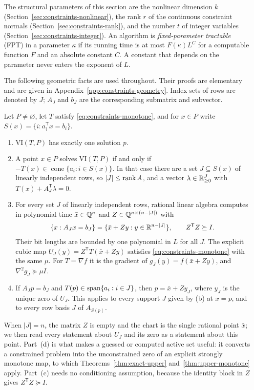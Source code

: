The structural parameters of this section are the nonlinear dimension $k$
(Section~\ref{sec:constraints-nonlinear}), the rank $r$ of the continuous
constraint normals (Section~\ref{sec:constraints-rank}), and the number $t$
of integer variables (Section~\ref{sec:constraints-integer}). An algorithm is
\emph{fixed-parameter tractable} (FPT) in a parameter $\kappa$ if its running
time is at most $F(\kappa)L^{C}$ for a computable function $F$ and an absolute
constant $C$. A constant that depends on the parameter never enters the
exponent of $L$.

The following geometric facts are used throughout. Their proofs are
elementary and are given in Appendix~\ref{app:constraints-geometry}. Index
sets of rows are denoted by $J$; $A_J$ and $b_J$ are the corresponding
submatrix and subvector.

\begin{lemma}
\label{lem:constraints-polyhedral}
Let $P\ne\varnothing$, let $T$ satisfy \eqref{eq:constraints-monotone}, and
for $x\in P$ write $S(x)=\{i:a_i^{\mathsf T}x=b_i\}$.
\begin{enumerate}[label=(\alph*)]
\item $\mathrm{VI}(T,P)$ has exactly one solution $p$.
\item A point $x\in P$ solves $\mathrm{VI}(T,P)$ if and only if
$-T(x)\in\operatorname{cone}\{a_i:i\in S(x)\}$. In that case there are a set
$J\subseteq S(x)$ of linearly independent rows, so $|J|\le\operatorname{rank} A$, and a
vector $\lambda\in\mathbb R^J_{\ge0}$ with $T(x)+A_J^{\mathsf T}\lambda=0$.
\item For every set $J$ of linearly independent rows, rational linear algebra
computes in polynomial time $\bar x\in\mathbb Q^n$ and $Z\in\mathbb Q^{n\times(n-|J|)}$
with
\[
 \{x:A_Jx=b_J\}=\{\bar x+Zy:y\in\mathbb R^{n-|J|}\},\qquad Z^{\mathsf T}Z\succeq I.
\]
Their bit lengths are bounded by one polynomial in $L$ for all $J$. The
explicit cubic map $U_J(y)=Z^{\mathsf T}T(\bar x+Zy)$ satisfies
\eqref{eq:constraints-monotone} with the same $\mu$. For $T=\nabla f$ it is
the gradient of $g_J(y)=f(\bar x+Zy)$, and $\nabla^2g_J\succeq\mu I$.
\item If $A_Jp=b_J$ and $T(p)\in\operatorname{span}\{a_i:i\in J\}$, then $p=\bar x+Zy_J$,
where $y_J$ is the unique zero of $U_J$. This applies to every support $J$
given by (b) at $x=p$, and to every row basis $J$ of $A_{S(p)}$.
\end{enumerate}
\end{lemma}

When $|J|=n$, the matrix $Z$ is empty and the chart is the single rational
point $\bar x$; we then read every statement about $U_J$ and its zero as a
statement about this point. Part~(d) is what makes a guessed or computed
active set useful: it converts a constrained problem into the unconstrained
zero of an explicit strongly monotone map, to which
Theorems~\ref{thm:exact-upper} and~\ref{thm:upper-monotone} apply. Part~(c)
needs no conditioning assumption, because the identity block in $Z$ gives
$Z^{\mathsf T}Z\succeq I$.

